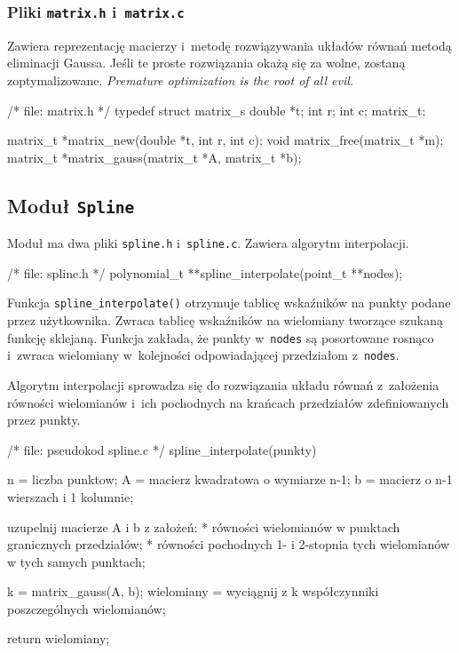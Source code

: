 \documentclass[10pt,a4paper]{article}
\newcommand{\p}[1]{\texttt{#1}}
\begin{document}
\subsubsection{Pliki \p{matrix.h} i~\p{matrix.c}}
Zawiera reprezentację macierzy i~metodę rozwiązywania układów równań metodą
eliminacji Gaussa. Jeśli te proste rozwiązania okażą się za wolne, zostaną
zoptymalizowane. \emph{Premature optimization is the root of all evil.}
\begin{SmallVerbatim}
    /* file: matrix.h */
    typedef struct matrix_s {
      double *t;
      int r;
      int c;
    } matrix_t;
    
    matrix_t *matrix_new(double *t, int r, int c);
    void matrix_free(matrix_t *m);
    matrix_t *matrix_gauss(matrix_t *A, matrix_t *b);
\end{SmallVerbatim}

\subsection{Moduł \p{Spline}}

Moduł ma dwa pliki \p{spline.h} i~\p{spline.c}. Zawiera algorytm interpolacji.
\begin{SmallVerbatim}
    /* file: spline.h */
    polynomial_t **spline_interpolate(point_t **nodes);
\end{SmallVerbatim}
Funkcja \p{spline\_interpolate()} otrzymuje tablicę wskaźników na punkty podane
przez użytkownika. Zwraca tablicę wskaźników na wielomiany tworzące szukaną
funkcję sklejaną. Funkcja zakłada, że punkty w~\p{nodes} są posortowane
rosnąco i~zwraca wielomiany w~kolejności odpowiadającej przedziałom
z~\p{nodes}.

Algorytm interpolacji sprowadza się do rozwiązania układu równań z~założenia
równości wielomianów i~ich pochodnych na krańcach przedziałów zdefiniowanych
przez punkty.
\begin{SmallVerbatim}
    /* file: pseudokod spline.c */
    spline_interpolate(punkty)
    {
      n = liczba punktow;
      A = macierz kwadratowa o wymiarze n-1;
      b = macierz o n-1 wierszach i 1 kolumnie;
      
      uzupelnij macierze A i b z założeń:
      * równości wielomianów w punktach granicznych przedziałów;
      * równości pochodnych 1- i 2-stopnia tych wielomianów w tych samych punktach;
      
      k = matrix_gauss(A, b);
      wielomiany = wyciągnij z k współczynniki poszczególnych wielomianów;
      
      return wielomiany;
    }
\end{SmallVerbatim}
\end{document}
